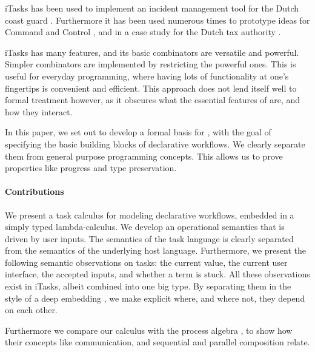 iTasks has been used to implement an incident management tool for the Dutch coast guard \cite{conf/iscram/LijnseJP12}.
Furthermore it has been used numerous times to prototype ideas for Command and Control \cite{theses/nlda/Kool17, theses/radboud/Stutterheim17}, and in a case study for the Dutch tax authority \cite{conf/sfp/StutterheimAP17}.

iTasks has many features, and its basic combinators are versatile and powerful.
Simpler combinators are implemented by restricting the powerful ones.
This is useful for everyday programming, where having lots of functionality at one's fingertips is convenient and efficient.
This approach does not lend itself well to formal treatment however, as it obscures what the essential features of \TOP are, and how they interact.

In this paper, we set out to develop a formal basis for \TOP, with the goal of specifying the basic building blocks of declarative workflows.
We clearly separate them from general purpose programming concepts.
This allows us to prove properties like progress and type preservation.

\paragraph{Contributions}
We present a task calculus for modeling declarative workflows, embedded in a simply typed lambda-calculus.
We develop an operational semantics that is driven by user inputs.
The semantics of the task language is clearly separated from the semantics of the underlying host language.
Furthermore, we present the following semantic observations on tasks: the current value, the current user interface, the accepted inputs, and whether a term is stuck.
All these observations exist in iTasks, albeit combined into one big type.
By separating them in the style of a deep embedding \cite{conf/cefp/Gibbons13}, we make explicit where, and where not, they depend on each other.

Furthermore we compare our calculus with the process algebra \CSP, to show how their concepts like communication, and sequential and parallel composition relate.

